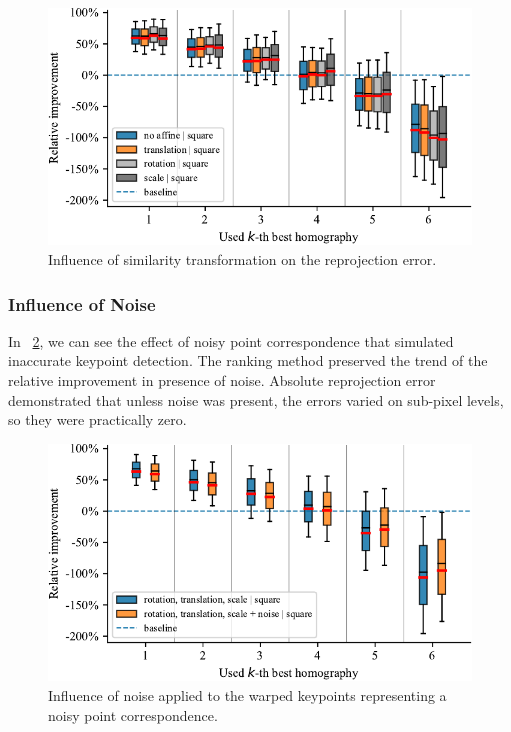 \def\boxplotimgwidth{0.75\linewidth}

\begin{figure}[t]
    \centering
    \includegraphics[width=\boxplotimgwidth]{figures/homography/similarity_transform_influence.pdf}
    \caption[Influence of similarity transformation]{Influence of similarity transformation on the reprojection error.}
    \label{fig:SimilarityTransformInfluence}
\end{figure}

\subsubsection{Influence of Noise}

In \figtext{}~\ref{fig:NoiseInfluence}, we can see the effect of noisy point correspondence that simulated inaccurate keypoint detection. The ranking method preserved the trend of the relative improvement in presence of noise. Absolute reprojection error demonstrated that unless noise was present, the errors varied on sub-pixel levels, so they were practically zero.

\begin{figure}[t]
    \centering
    \includegraphics[width=\boxplotimgwidth]{figures/homography/noise_influence.pdf}
    \caption[Influence of noise]{Influence of noise applied to the warped keypoints representing a noisy point correspondence.}
    \label{fig:NoiseInfluence}
\end{figure}

